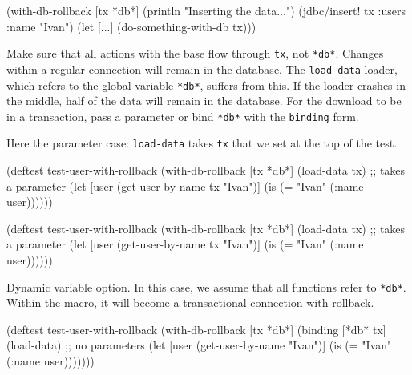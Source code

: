 \else

\begin{english}
  \begin{clojure}
(with-db-rollback [tx *db*]
  (println "Inserting the data...")
  (jdbc/insert! tx :users {:name "Ivan"})
  (let [...]
    (do-something-with-db tx)))
  \end{clojure}
\end{english}

\fi

Make sure that all actions with the base flow through \verb|tx|, not \verb|*db*|. Changes within a regular connection will remain in the database. The \verb|load-data| loader, which refers to the global variable \verb|*db*|, suffers from this. If the loader crashes in the middle, half of the data will remain in the database. For the download to be in a transaction, pass a parameter or bind \verb|*db*| with the \verb|binding| form.

Here the parameter case: \verb|load-data| takes \verb|tx| that we set at the top of the test.

\ifx\DEVICETYPE\MOBILE

\begin{english}
  \begin{clojure}
(deftest test-user-with-rollback
  (with-db-rollback [tx *db*]
    (load-data tx) ;; takes a parameter
    (let [user
          (get-user-by-name tx "Ivan")]
      (is (= "Ivan" (:name user))))))
  \end{clojure}
\end{english}

\else

\begin{english}
  \begin{clojure}
(deftest test-user-with-rollback
  (with-db-rollback [tx *db*]
    (load-data tx) ;; takes a parameter
    (let [user (get-user-by-name tx "Ivan")]
      (is (= "Ivan" (:name user))))))
  \end{clojure}
\end{english}

\fi


Dynamic variable option. In this case, we assume that all functions refer to \verb|*db*|. Within the macro, it will become a transactional connection with rollback.

\ifx\DEVICETYPE\MOBILE

\begin{english}
  \begin{clojure}
(deftest test-user-with-rollback
  (with-db-rollback [tx *db*]
    (binding [*db* tx]
      (load-data) ;; no parameters
      (let [user
            (get-user-by-name "Ivan")]
        (is (= "Ivan" (:name user)))))))
  \end{clojure}
\end{english}

